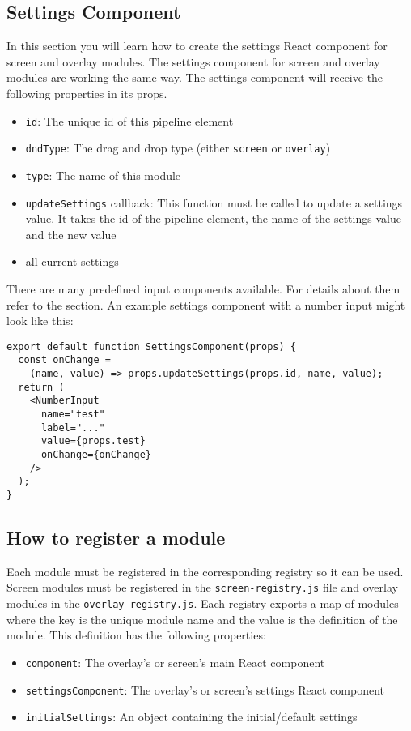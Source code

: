 \subsection{Settings Component}
\label{sec:settings-component}
In this section you will learn how to create the settings React component for screen and overlay modules.
The settings component for screen and overlay modules are working the same way. 
The settings component will receive the following properties in its props.
\begin{itemize}
  \item \texttt{id}: The unique id of this pipeline element
  \item \texttt{dndType}: The drag and drop type (either \texttt{screen} or \texttt{overlay})
  \item \texttt{type}: The name of this module
  \item \texttt{updateSettings} callback: This function must be called to update a settings value. 
    It takes the id of the pipeline element, the name of the settings value and the new value
  \item all current settings
\end{itemize}

There are many predefined input components available. 
For details about them refer to the  section. 
An example settings component with a number input might look like this:
\begin{verbatim}
export default function SettingsComponent(props) {
  const onChange = 
    (name, value) => props.updateSettings(props.id, name, value);
  return (
    <NumberInput 
      name="test" 
      label="..." 
      value={props.test} 
      onChange={onChange} 
    />
  );
}
\end{verbatim}

\subsection{How to register a module}
Each module must be registered in the corresponding registry so it can be used. 
Screen modules must be registered in the \texttt{screen-registry.js} file and overlay modules in the \texttt{overlay-registry.js}. 
Each registry exports a map of modules where the key is the unique module name and the value is the definition of the module. 
This definition has the following properties:
\begin{itemize}
  \item \texttt{component}: The overlay's or screen's main React component
  \item \texttt{settingsComponent}: The overlay's or screen's settings React component
  \item \texttt{initialSettings}: An object containing the initial/default settings
\end{itemize}

